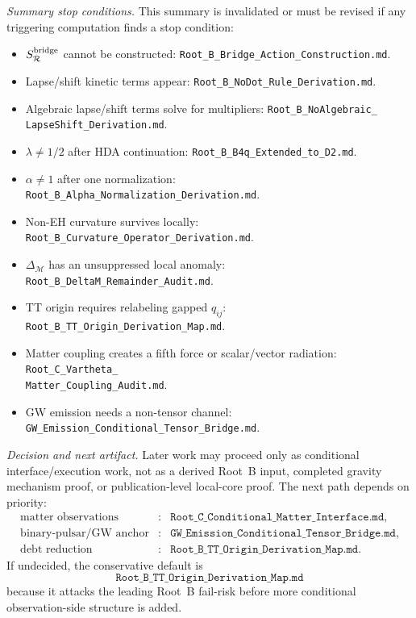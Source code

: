 \documentclass[11pt]{article}
\begin{document}
\medskip\noindent\textit{Summary stop conditions.}
This summary is invalidated or must be revised if any triggering computation
finds a stop condition:
\begin{itemize}
\item \(S_{\mathcal R}^{\rm bridge}\) cannot be constructed:
  \texttt{Root\_B\_Bridge\_Action\_Construction.md}.
\item Lapse/shift kinetic terms appear:
  \texttt{Root\_B\_NoDot\_Rule\_Derivation.md}.
\item Algebraic lapse/shift terms solve for multipliers:
  \texttt{Root\_B\_NoAlgebraic\_}\\
  \texttt{LapseShift\_Derivation.md}.
\item \(\lambda\ne1/2\) after HDA continuation:
  \texttt{Root\_B\_B4q\_Extended\_to\_D2.md}.
\item \(\alpha\ne1\) after one normalization:
  \texttt{Root\_B\_Alpha\_Normalization\_Derivation.md}.
\item Non-EH curvature survives locally:
  \texttt{Root\_B\_Curvature\_Operator\_Derivation.md}.
\item \(\Delta_{\mathcal M}\) has an unsuppressed local anomaly:
  \texttt{Root\_B\_DeltaM\_Remainder\_Audit.md}.
\item TT origin requires relabeling gapped \(q_{ij}\):
  \texttt{Root\_B\_TT\_Origin\_Derivation\_Map.md}.
\item Matter coupling creates a fifth force or scalar/vector radiation:
  \texttt{Root\_C\_Vartheta\_}\\
  \texttt{Matter\_Coupling\_Audit.md}.
\item GW emission needs a non-tensor channel:
  \texttt{GW\_Emission\_Conditional\_Tensor\_Bridge.md}.
\end{itemize}

\medskip\noindent\textit{Decision and next artifact.}
Later work may proceed only as conditional interface/execution work, not as a
derived Root~B input, completed gravity mechanism proof, or publication-level
local-core proof.  The next path depends on priority:
\[
\boxed{
\begin{array}{lll}
\text{matter observations} &:& \texttt{Root\_C\_Conditional\_Matter\_Interface.md},\\
\text{binary-pulsar/GW anchor} &:& \texttt{GW\_Emission\_Conditional\_Tensor\_Bridge.md},\\
\text{debt reduction} &:& \texttt{Root\_B\_TT\_Origin\_Derivation\_Map.md}.
\end{array}}
\]
If undecided, the conservative default is
\[
\boxed{\texttt{Root\_B\_TT\_Origin\_Derivation\_Map.md}}
\]
because it attacks the leading Root~B fail-risk before more conditional
observation-side structure is added.
\end{document}

